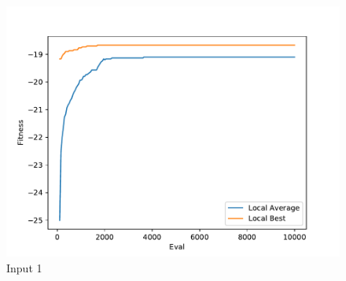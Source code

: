 \documentclass{standalone}
\begin{document}
\begin{figure}[!htb]
	\caption{Input 1}
	\label{fig:graph_1027}
	\includegraphics[width=\textwidth]{../graphs/graphs/1027.pdf}
\end{figure}
\end{document}
